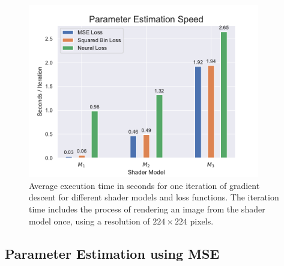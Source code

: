 \begin{figure}[h]
    \centering
    \includegraphics[width=0.9\textwidth]{img/evaluation/Parameter Estimation Speed.pdf}
    \caption{Average execution time in seconds for one iteration of gradient descent for different shader models and loss functions. The iteration time includes the process of rendering an image from the shader model once, using a resolution of $224\times224$ pixels.}
    \label{fig:ParameterEstimationSpeed}
\end{figure}


\subsection{Parameter Estimation using MSE}

